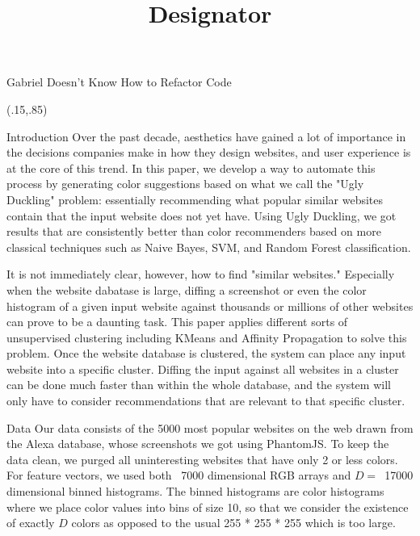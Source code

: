 \documentclass{beamer}
\title[Designator]{Designator}
\begin{document}
\begin{frame}{\centerline{\Huge Gabriel Doesn't Know How to Refactor Code}}
\begin{textblock}{5}(.15,.85)
\begin{block}{Introduction}
Over the past decade, aesthetics have gained a lot of importance in the decisions companies
make in how they design websites, and user experience is at the core of this trend.  In this paper, we develop a way to automate this process by generating color suggestions based on what we call the "Ugly Duckling" problem: essentially recommending what popular similar websites contain that the input website does not yet have. Using Ugly Duckling, we got results that are consistently better than color recommenders based on more classical techniques such as Naive Bayes, SVM, and Random Forest classification.

It is not immediately clear, however, how to find "similar websites." Especially when the website dabatase is large, diffing a screenshot or even the color histogram of a given input website against thousands or millions of other websites can prove to be a daunting task. This paper applies different sorts of unsupervised clustering including KMeans and Affinity Propagation to solve this problem. Once the website database is clustered, the system can place
any input website into a specific cluster. Diffing the input against all websites in a cluster can be
done much faster than within the whole database, and the system will only have to consider
recommendations that are relevant to that specific cluster. 
\end{block}

\begin{block}{Data}
Our data consists of the 5000 most popular websites on the web drawn from the Alexa database, whose screenshots we got using PhantomJS. To keep the data clean, we purged all uninteresting websites that have only 2 or less colors. For feature vectors, we used both ~7000 dimensional RGB arrays and $D=$~17000 dimensional binned histograms. The binned histograms are color histograms where we place color values into bins of size 10, so that we consider the existence of exactly $D$ colors as opposed to the usual 255 * 255 * 255 which is too large.
\end{block}


\end{textblock}
\end{frame}
\end{document}
